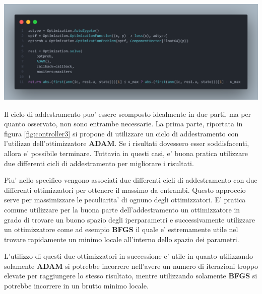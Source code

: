 \begin{minipage}{\linewidth}
	\centering
	\includegraphics[width=\textwidth]{img/controller3.png}
	\label{fig:controller3}
\end{minipage}

Il ciclo di addestramento puo' essere scomposto idealmente in due parti, ma per quanto osservato, non sono 
entrambe necessarie. La prima parte, riportata in figura \ref{fig:controller3} si propone di utilizzare un ciclo di addestramento 
con l'utilizzo dell'ottimizzatore \textbf{ADAM}. Se i risultati dovessero esser soddisfacenti, allora e' possibile terminare. 
Tuttavia in questi casi, e' buona pratica utilizzare due differenti cicli di addestramento per migliorare i risultati. 

Piu' nello specifico vengono associati due differenti cicli di addestramento con due differenti ottimizzatori per ottenere il massimo 
da entrambi. Questo approccio serve per massimizzare le peculiarita' di ognuno degli ottimizzatori. E' pratica comune utilizzare per la 
buona parte dell'addestramento un ottimizzatore in grado di trovare un buono spazio degli iperparametri e successivamente utilizzare 
un ottimizzatore come ad esempio \textbf{BFGS} \cite{10.1093/imamat/6.1.76} \cite{35d0019d-775a-3628-b0b4-67be112e346b} \cite{10.1093/comjnl/13.3.317} \cite{e3177091-3094-3792-9d61-0ab445735ddb}
il quale e' estremamente utile nel trovare rapidamente un minimo locale all'interno dello spazio dei parametri.

L'utilizzo di questi due ottimizzatori in successione e' utile in quanto utilizzando solamente \textbf{ADAM} si potrebbe 
incorrere nell'avere un numero di iterazioni troppo elevate per raggiungere lo stesso risultato, mentre utilizzando solamente \textbf{BFGS} si 
potrebbe incorrere in un brutto minimo locale.

